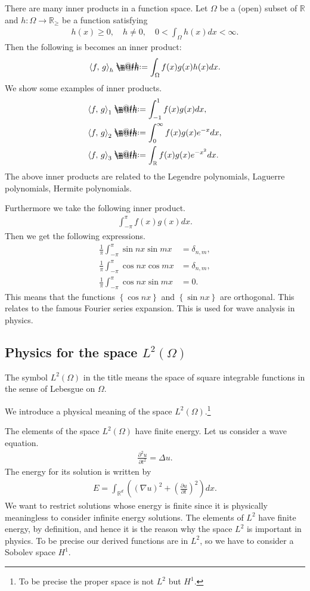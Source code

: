 \documentclass[openany, a4paper, oneside]{jsbook}
\makeatletter
\newcommand*{\defeq}{\mathrel{\rlap{%
\raisebox{0.3ex}{$\m@th\cdot$}}%
\raisebox{-0.3ex}{$\m@th\cdot$}}%
=}
\theoremstyle{break}
\theoremstyle{breakdefn}
\newcommand{\rbk}[1]{\left (#1\right)}
\newcommand{\cbk}[1]{\left\{#1\right\}}
\newcommand{\bkt}[2]{\left\langle#1,\,#2\right\rangle}
\newcommand{\bbR}{\mathbb{R}}
\makeatother
\begin{document}
There are many inner products in a function space.
Let $\Omega$ be a (open) subset of $\bbR$ and $h \colon \Omega \to \bbR_{\geq}$ be a function satisfying
\begin{align}
 h(x) \geq 0, \quad
 h \neq 0, \quad
 0 < \int_\Omega h(x) dx < \infty.
\end{align}
Then the following is becomes an inner product:
\begin{align}
 \bkt{f}{g}_{h}
 \defeq
 \int_{\Omega} f(x) g(x) h(x) dx.
\end{align}
We show some examples of inner products.
\begin{align}
 \bkt{f}{g}_1
 &\defeq
 \int_{-1}^{1} f(x) g(x) dx, \\
 \bkt{f}{g}_2
 &\defeq
 \int_{0}^{\infty} f(x) g(x) e^{-x} dx, \\
 \bkt{f}{g}_3
 &\defeq
 \int_{\bbR} f(x) g(x) e^{-x^2} dx.
\end{align}
The above inner products are related to
the Legendre polynomials, Laguerre polynomials, Hermite polynomials.

Furthermore we take the following inner product.
\begin{align}
 \int_{- \pi}^{\pi} f(x) g(x) dx.
\end{align}
Then we get the following expressions.
\begin{align}
 \frac{1}{\pi} \int_{-\pi}^{\pi} \sin nx \sin mx
 &=
 \delta_{n,m}, \\
 \frac{1}{\pi} \int_{-\pi}^{\pi} \cos nx \cos mx
 &=
 \delta_{n,m}, \\
 \frac{1}{\pi} \int_{-\pi}^{\pi} \cos nx \sin mx
 &= 0.
\end{align}
This means that the functions $\cbk{\cos nx}$ and $\cbk{\sin nx}$ are orthogonal.
This relates to the famous Fourier series expansion.
This is used for wave analysis in physics.
\subsection{Physics for the space $L^2 \rbk{\Omega}$}


The symbol $L^2 \rbk{\Omega}$ in the title means
the space of square integrable functions in the sense of Lebesgue on $\Omega$.

We introduce a physical meaning of the space $L^2 \rbk{\Omega}$.\footnote{To be precise the proper space is not $L^2$ but $H^1$.
 }

The elements of the space $L^2 \rbk{\Omega}$ have finite energy.
Let us consider a wave equation.
\begin{align}
 \frac{\partial^2 u}{\partial t^2}
 =
 \Delta u.
\end{align}
The energy for its solution is written by
\begin{align}
 E
 =
 \int_{\mathbb{R}^d} \rbk{\rbk{\nabla u}^2 + \rbk{\frac{\partial u}{\partial t}}^2}dx.
\end{align}
We want to restrict solutions whose energy is finite
since it is physically meaningless to consider infinite energy solutions.
The elements of $L^2$ have finite energy, by definition,
and hence it is the reason why the space $L^2$ is important in physics.
To be precise our derived functions are in $L^2$, so
we have to consider a Sobolev space $H^1$.
\end{document}

